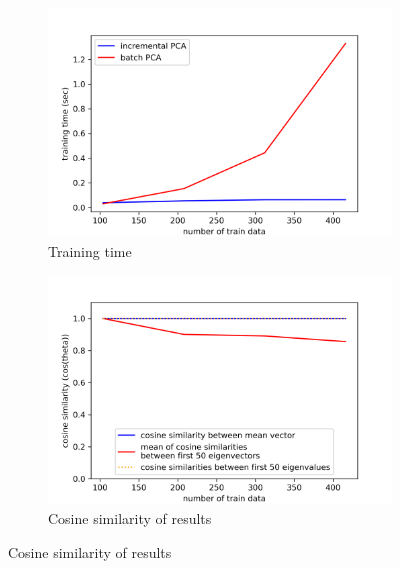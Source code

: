 \vspace{-0.5cm}
\begin{figure}[htbp]
	\centering
	\begin{subfigure}{0.48\linewidth}
		\centering
		\includegraphics[width=\linewidth]{image/q2-fig1.png}
		\caption{Training time}
		\label{fig:q2-fig1}
	\end{subfigure}%
	\hfill
	\begin{subfigure}{0.48\linewidth}
		\centering
		\includegraphics[width=\linewidth]{image/q2-fig2.png}
		\caption{Cosine similarity of results}
		\label{fig:q2-fig2}
	\end{subfigure}
	

\end{figure}

